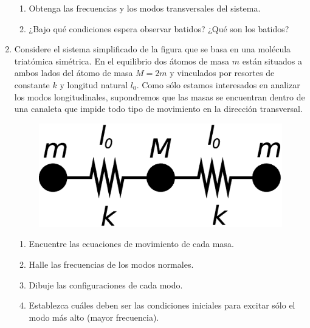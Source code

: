 \documentclass[11pt,spanish,a4paper]{article}
\begin{document}
\begin{enumerate}
\begin{enumerate}
\item Obtenga las frecuencias y los modos transversales del sistema. 
\item ¿Bajo qué condiciones espera observar batidos? ¿Qué son los batidos?
\end{enumerate}
\item Considere el sistema simplificado de la figura que se basa en una
molécula triatómica simétrica. En el equilibrio dos átomos de masa
$m$ están situados a ambos lados del átomo de masa $M=2m$ y vinculados
por resortes de constante $k$ y longitud natural $l_{0}$. Como sólo
estamos interesados en analizar los modos longitudinales, supondremos
que las masas se encuentran dentro de una canaleta que impide todo
tipo de movimiento en la dirección transversal. 
\begin{figure}[H]
\centering{}\includegraphics[clip,scale=0.25]{ej1-9}
\end{figure}


\begin{enumerate}
\item Encuentre las ecuaciones de movimiento de cada masa. 
\item Halle las frecuencias de los modos normales. 
\item Dibuje las configuraciones de cada modo. 
\item Establezca cuáles deben ser las condiciones iniciales para excitar
sólo el modo más alto (mayor frecuencia).
\end{enumerate}



\end{enumerate}
\end{document}
